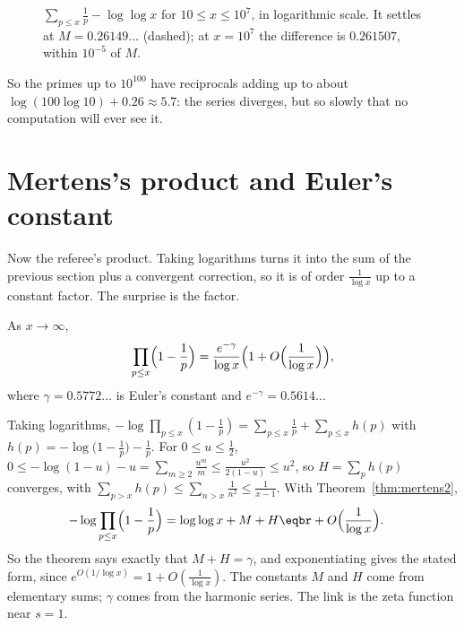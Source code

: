 \begin{figure}[ht]
\centering
{}
\caption{$\sum_{p\le x}\frac1p-\log\log x$ for $10\le x\le10^7$, in logarithmic scale. It settles at $M=0.26149\ldots$ (dashed); at $x=10^7$ the difference is
$0.261507$, within $10^{-5}$ of $M$.}
\label{fig:mertens}
\end{figure}

So the primes up to $10^{100}$ have reciprocals adding up to about $\log(100\log10)+0.26\approx5.7$: the series diverges, but so slowly that no
computation will ever see it.

\section{Mertens's product and Euler's constant}

Now the referee's product. Taking logarithms turns it into the sum of the previous section plus a convergent correction, so it is of order
$\frac1{\log x}$ up to a constant factor. The surprise is the factor.

\begin{theorem}[Mertens, 1874]\label{thm:mertens3}
As $x\to\infty$,
\[
\prod_{p\le x}\Bigl(1-\frac1p\Bigr)=\frac{e^{-\gamma}}{\log x}\Bigl(1+O\Bigl(\frac1{\log x}\Bigr)\Bigr),
\]
where $\gamma=0.5772\ldots$ is Euler's constant and $e^{-\gamma}=0.5614\ldots$
\end{theorem}

Taking logarithms, $-\log\prod_{p\le x}(1-\frac1p)=\sum_{p\le x}\frac1p+\sum_{p\le x}h(p)$ with $h(p)=-\log\bigl(1-\frac1p\bigr)-\frac1p$. For $0\le u\le\frac12$,
$0\le-\log(1-u)-u=\sum_{m\ge2}\frac{u^m}m\le\frac{u^2}{2(1-u)}\le u^2$, so $H=\sum_ph(p)$ converges, with $\sum_{p>x}h(p)\le\sum_{n>x}\frac1{n^2}\le\frac1{x-1}$. With
Theorem~\ref{thm:mertens2},
\[
\begin{aligned}-\log\prod_{p\le x}\Bigl(1-\frac1p\Bigr)&=\log\log x+M+H\eqbr+O\Bigl(\frac1{\log x}\Bigr).\end{aligned}
\]
So the theorem says exactly that $M+H=\gamma$, and exponentiating gives the stated form, since $e^{O(1/\log x)}=1+O(\frac1{\log x})$. The constants $M$ and $H$
come from elementary sums; $\gamma$ comes from the harmonic series. The link is the zeta function near $s=1$.


